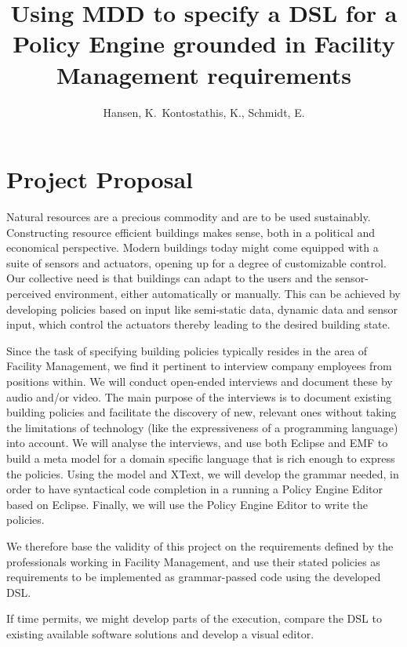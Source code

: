 \documentclass{llncs}
\begin{document}
\frontmatter
\pagestyle{headings}
\title{Using MDD to specify a DSL for a Policy Engine grounded in Facility Management requirements}
\author{Hansen, K.\, Kontostathis, K., Schmidt, E.}
\maketitle
\section{Project Proposal}
Natural resources are a precious commodity and are to be used sustainably. Constructing resource efficient buildings makes sense, both in a political and economical perspective. Modern buildings today might come equipped with a suite of sensors and actuators, opening up for a degree of customizable control. Our collective need is that buildings can adapt to the users and the sensor-perceived environment, either automatically or manually. This can be achieved by developing policies based on input like semi-static data, dynamic data and sensor input, which control the actuators thereby leading to the desired building state.

Since the task of specifying building policies typically resides in the area of Facility Management, we find it pertinent to interview company employees from positions within. We will conduct open-ended interviews and document these by audio and/or video. The main purpose of the interviews is to document existing building policies and facilitate the discovery of new, relevant ones without taking the limitations of technology (like the expressiveness of a programming language) into account. We will analyse the interviews, and use both Eclipse and EMF to build a meta model for a domain specific language that is rich enough to express the policies. Using the model and XText, we will develop the grammar needed, in order to have syntactical code completion in a running a Policy Engine Editor based on Eclipse. Finally, we will use the Policy Engine Editor to write the policies.

We therefore base the validity of this project on the requirements defined by the professionals working in Facility Management, and use their stated policies as requirements to be implemented as grammar-passed code using the developed DSL.

If time permits, we might develop parts of the execution, compare the DSL to existing available software solutions and develop a visual editor.
\end{document}

